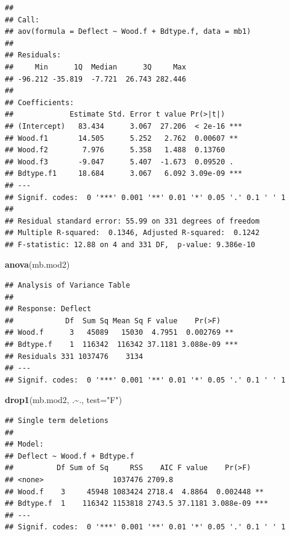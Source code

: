 \documentclass[
]{book}
\newenvironment{Shaded}{\begin{snugshade}}{\end{snugshade}}
\newcommand{\AttributeTok}[1]{\textcolor[rgb]{0.13,0.29,0.53}{#1}}
\newcommand{\FunctionTok}[1]{\textcolor[rgb]{0.13,0.29,0.53}{\textbf{#1}}}
\newcommand{\NormalTok}[1]{#1}
\newcommand{\SpecialCharTok}[1]{\textcolor[rgb]{0.81,0.36,0.00}{\textbf{#1}}}
\newcommand{\StringTok}[1]{\textcolor[rgb]{0.31,0.60,0.02}{#1}}
\begin{document}
\begin{verbatim}
## 
## Call:
## aov(formula = Deflect ~ Wood.f + Bdtype.f, data = mb1)
## 
## Residuals:
##     Min      1Q  Median      3Q     Max 
## -96.212 -35.819  -7.721  26.743 282.446 
## 
## Coefficients:
##             Estimate Std. Error t value Pr(>|t|)    
## (Intercept)   83.434      3.067  27.206  < 2e-16 ***
## Wood.f1       14.505      5.252   2.762  0.00607 ** 
## Wood.f2        7.976      5.358   1.488  0.13760    
## Wood.f3       -9.047      5.407  -1.673  0.09520 .  
## Bdtype.f1     18.684      3.067   6.092 3.09e-09 ***
## ---
## Signif. codes:  0 '***' 0.001 '**' 0.01 '*' 0.05 '.' 0.1 ' ' 1
## 
## Residual standard error: 55.99 on 331 degrees of freedom
## Multiple R-squared:  0.1346, Adjusted R-squared:  0.1242 
## F-statistic: 12.88 on 4 and 331 DF,  p-value: 9.386e-10
\end{verbatim}

\begin{Shaded}
\begin{Highlighting}[]
\FunctionTok{anova}\NormalTok{(mb.mod2)}
\end{Highlighting}
\end{Shaded}

\begin{verbatim}
## Analysis of Variance Table
## 
## Response: Deflect
##            Df  Sum Sq Mean Sq F value    Pr(>F)    
## Wood.f      3   45089   15030  4.7951  0.002769 ** 
## Bdtype.f    1  116342  116342 37.1181 3.088e-09 ***
## Residuals 331 1037476    3134                      
## ---
## Signif. codes:  0 '***' 0.001 '**' 0.01 '*' 0.05 '.' 0.1 ' ' 1
\end{verbatim}

\begin{Shaded}
\begin{Highlighting}[]
\FunctionTok{drop1}\NormalTok{(mb.mod2, .}\SpecialCharTok{\textasciitilde{}}\NormalTok{., }\AttributeTok{test=}\StringTok{"F"}\NormalTok{)}
\end{Highlighting}
\end{Shaded}

\begin{verbatim}
## Single term deletions
## 
## Model:
## Deflect ~ Wood.f + Bdtype.f
##          Df Sum of Sq     RSS    AIC F value    Pr(>F)    
## <none>                1037476 2709.8                      
## Wood.f    3     45948 1083424 2718.4  4.8864  0.002448 ** 
## Bdtype.f  1    116342 1153818 2743.5 37.1181 3.088e-09 ***
## ---
## Signif. codes:  0 '***' 0.001 '**' 0.01 '*' 0.05 '.' 0.1 ' ' 1
\end{verbatim}
\end{document}
